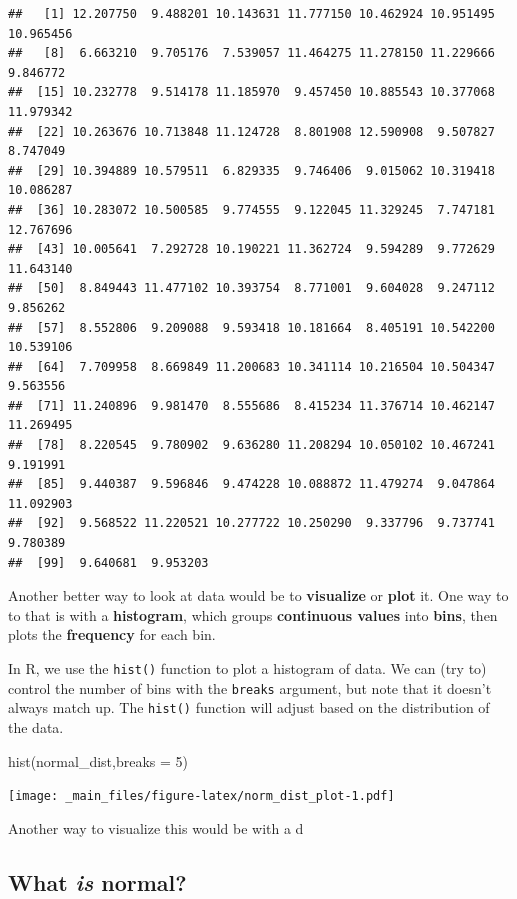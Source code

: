 \documentclass[
]{book}
\newenvironment{Shaded}{\begin{snugshade}}{\end{snugshade}}
\newcommand{\AttributeTok}[1]{\textcolor[rgb]{0.77,0.63,0.00}{#1}}
\newcommand{\DecValTok}[1]{\textcolor[rgb]{0.00,0.00,0.81}{#1}}
\newcommand{\FunctionTok}[1]{\textcolor[rgb]{0.00,0.00,0.00}{#1}}
\newcommand{\NormalTok}[1]{#1}
\begin{document}
\begin{verbatim}
##   [1] 12.207750  9.488201 10.143631 11.777150 10.462924 10.951495 10.965456
##   [8]  6.663210  9.705176  7.539057 11.464275 11.278150 11.229666  9.846772
##  [15] 10.232778  9.514178 11.185970  9.457450 10.885543 10.377068 11.979342
##  [22] 10.263676 10.713848 11.124728  8.801908 12.590908  9.507827  8.747049
##  [29] 10.394889 10.579511  6.829335  9.746406  9.015062 10.319418 10.086287
##  [36] 10.283072 10.500585  9.774555  9.122045 11.329245  7.747181 12.767696
##  [43] 10.005641  7.292728 10.190221 11.362724  9.594289  9.772629 11.643140
##  [50]  8.849443 11.477102 10.393754  8.771001  9.604028  9.247112  9.856262
##  [57]  8.552806  9.209088  9.593418 10.181664  8.405191 10.542200 10.539106
##  [64]  7.709958  8.669849 11.200683 10.341114 10.216504 10.504347  9.563556
##  [71] 11.240896  9.981470  8.555686  8.415234 11.376714 10.462147 11.269495
##  [78]  8.220545  9.780902  9.636280 11.208294 10.050102 10.467241  9.191991
##  [85]  9.440387  9.596846  9.474228 10.088872 11.479274  9.047864 11.092903
##  [92]  9.568522 11.220521 10.277722 10.250290  9.337796  9.737741  9.780389
##  [99]  9.640681  9.953203
\end{verbatim}

Another better way to look at data would be to \textbf{visualize} or \textbf{plot} it. One way to to that is with a \textbf{histogram}, which groups \textbf{continuous values} into \textbf{bins}, then plots the \textbf{frequency} for each bin.

In R, we use the \texttt{hist()} function to plot a histogram of data. We can (try to) control the number of bins with the \texttt{breaks} argument, but note that it doesn't always match up. The \texttt{hist()} function will adjust based on the distribution of the data.

\begin{Shaded}
\begin{Highlighting}[]
\FunctionTok{hist}\NormalTok{(normal\_dist,}\AttributeTok{breaks =} \DecValTok{5}\NormalTok{)}
\end{Highlighting}
\end{Shaded}

\texttt{[image: \_main\_files/figure-latex/norm\_dist\_plot-1.pdf]}

Another way to visualize this would be with a d

\hypertarget{what-is-normal}{%
\subsection{\texorpdfstring{What \emph{is} normal?}{What is normal?}}\label{what-is-normal}}
\end{document}
